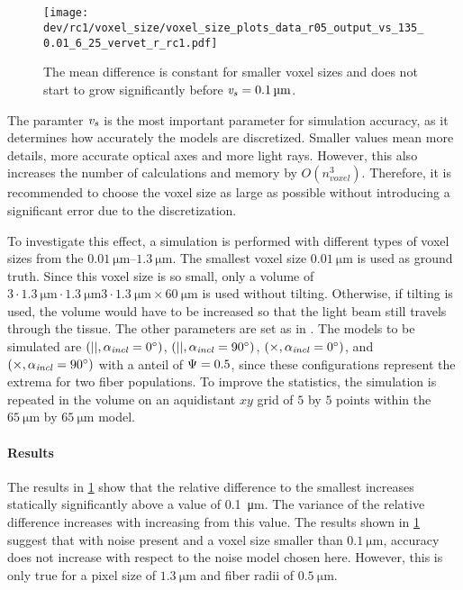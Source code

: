 \subsection{\Voxelsize{}\texorpdfstring{\voxelsize{}}{}}
%
%
\begin{figure}[!t]%
\centering
\texttt{[image: dev/rc1/voxel\_size/voxel\_size\_plots\_data\_r05\_output\_vs\_135\_0.01\_6\_25\_vervet\_r\_rc1.pdf]}
\caption[voxel size model with noise]{The mean difference is constant for smaller voxel sizes and does not start to grow significantly before $\voxelsize=\SI{0.1}{\micro\meter}$.}
\label{fig:voxelsizeNoise}
\end{figure}
%
The \Voxelsize{} paramter $\textnormal{$\mathit{v_{s}}$}$ is the most important parameter for simulation accuracy, as it determines how accurately the models are discretized.
Smaller values mean more details, more accurate optical axes and more light rays.
However, this also increases the number of calculations and memory by $O(n_{\mathit{voxel}}^3)$.
Therefore, it is recommended to choose the voxel size as large as possible without introducing a significant error due to the discretization.
\par
%
To investigate this effect, a simulation is performed with different types of voxel sizes from the $\SIrange{0.01}{1.3}{\micro\meter}$.
The smallest voxel size $\SI{0.01}{\micro\meter}$ is used as ground truth.
Since this voxel size is so small, only a volume of $3 \cdot \SI{1.3}{\micro\meter} \cdot \SI{1.3}{\micro\meter} 3 \cdot \SI{1.3}{\micro\meter} \times \SI{60}{\micro\meter}$ is used without tilting.
Otherwise, if tilting is used, the volume would have to be increased so that the light beam still travels through the tissue.
The other parameters are set as in \dummy{}.
The models to be simulated are $(||,\textnormal{$\alpha_{\mathit{incl}}$} = \SI{0}{\degree})$, $(||,\textnormal{$\alpha_{\mathit{incl}}$} = \SI{90}{\degree})$, $(\times,\textnormal{$\alpha_{\mathit{incl}}$} = \SI{0}{\degree})$, and $(\times,\textnormal{$\alpha_{\mathit{incl}}$} = \SI{90}{\degree})$ with a anteil of $\textnormal{$\Psi$} = \SI{0.5}{}$, since these configurations represent the extrema for two fiber populations.
To improve the statistics, the simulation is repeated in the volume on an aquidistant $xy$ grid of $\num{5}$ by $\num{5}$ points within the $\SI{65}{\micro\meter}$ by $\SI{65}{\micro\meter}$ model.
%
\paragraph{Results}
The results in \cref{fig:voxelsizeNoise} show that the relative difference to the smallest \Voxelsize{} increases statically significantly above a value of \SI{0.1}{\micro\meter}.
The variance of the relative difference increases with increasing \Voxelsize{} from this value.
%
The results shown in \cref{fig:voxelsizeNoise} suggest that with noise present and a voxel size smaller than $\SI{0.1}{\micro\meter}$, accuracy does not increase with respect to the noise model chosen here.
However, this is only true for a pixel size of $\SI{1.3}{\micro\meter}$ and fiber radii of $\SI{0.5}{\micro\meter}$.
% 
%
%

